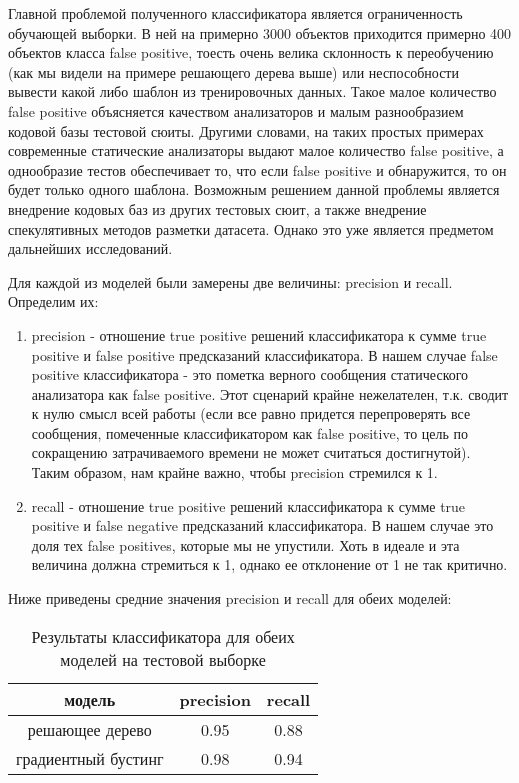 Главной проблемой полученного классификатора является ограниченность обучающей выборки. В ней на примерно 3000 объектов приходится примерно 400 объектов класса false positive, тоесть очень велика склонность к переобучению (как мы видели на примере решающего дерева выше) или неспособности вывести какой либо шаблон из тренировочных данных. Такое малое количество false positive объясняется качеством анализаторов и малым разнообразием кодовой базы тестовой сюиты. Другими словами, на таких простых примерах современные статические анализаторы выдают малое количество false positive, а однообразие тестов обеспечивает то, что если false positive и обнаружится, то он будет только одного шаблона. Возможным решением данной проблемы является внедрение кодовых баз из других тестовых сюит, а также внедрение спекулятивных методов разметки датасета. Однако это уже является предметом дальнейших исследований.

Для каждой из моделей были замерены две величины: precision и recall. Определим их:

\begin{enumerate}
    \item precision - отношение true positive решений классификатора к сумме true positive и false positive предсказаний классификатора. В нашем случае false positive классификатора - это пометка верного сообщения статического анализатора как false positive. Этот сценарий крайне нежелателен, т.к. сводит к нулю смысл всей работы (если все равно придется перепроверять все сообщения, помеченные классификатором как false positive, то цель по сокращению затрачиваемого времени не может считаться достигнутой). Таким образом, нам крайне важно, чтобы precision стремился к 1.
    \item recall - отношение true positive решений классификатора к сумме true positive и false negative предсказаний классификатора. В нашем случае это доля тех false positives, которые мы не упустили. Хоть в идеале и эта величина должна стремиться к 1, однако ее отклонение от 1 не так критично.
\end{enumerate}

Ниже приведены средние значения precision и recall для обеих моделей:

\begin{table}[H]
    \centering
    \begin{tabular}{|c|c|c|}
        \hline
        модель              & precision & recall \\ \hline
        решающее дерево     & 0.95      & 0.88   \\ \hline
        градиентный бустинг & 0.98      & 0.94   \\ \hline
    \end{tabular}
    \caption{Результаты классификатора для обеих моделей на тестовой выборке}
\end{table}

